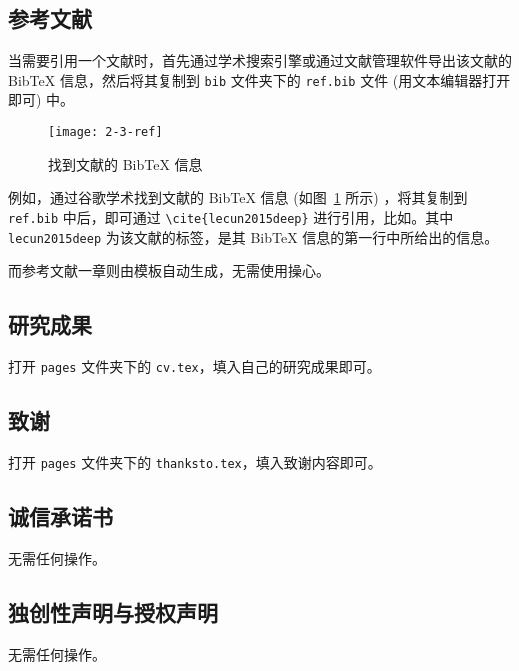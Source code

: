 \subsection{参考文献}

当需要引用一个文献时，首先通过学术搜索引擎或通过文献管理软件导出该文献的 BibTeX 信息，然后将其复制到 \texttt{bib} 文件夹下的 \texttt{ref.bib} 文件 (用文本编辑器打开即可) 中。

\begin{figure}[H]
    \centering
    \texttt{[image: 2-3-ref]}
    \caption{\label{fig:ref} 找到文献的 BibTeX 信息}
\end{figure}

例如，通过谷歌学术找到文献的 BibTeX 信息 (如图~\ref{fig:ref} 所示) ，将其复制到 \texttt{ref.bib} 中后，即可通过 \verb|\cite{lecun2015deep}| 进行引用，比如\cite{lecun2015deep}。其中 \texttt{lecun2015deep} 为该文献的标签，是其 BibTeX 信息的第一行中所给出的信息。

而参考文献一章则由模板自动生成，无需使用操心。

\subsection{研究成果}

打开 \texttt{pages} 文件夹下的 \texttt{cv.tex}，填入自己的研究成果即可。

\subsection{致谢}

打开 \texttt{pages} 文件夹下的 \texttt{thanksto.tex}，填入致谢内容即可。

\subsection{诚信承诺书}

无需任何操作。

\subsection{独创性声明与授权声明}

无需任何操作。
